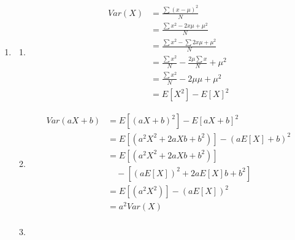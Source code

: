 \documentclass{article}
\begin{document}
\begin{enumerate}
\begin{enumerate}
        Prior: $P(\mu) = \frac{1}{\sqrt{2\pi \tau^2}} \exp\left(-\frac{(\mu - \mu_0)^2}{2\tau^2}\right)$ where $\mu_0 = 0$ and $\tau^2 = 1$.


        $$\log P(\mu | x_1) \propto -\frac{(5 - \mu)^2}{2(4)} - \frac{\mu^2}{2(1)}$$

        $$\frac{d}{d\mu} \left[ -\frac{(5 - \mu)^2}{8} - \frac{\mu^2}{2} \right] = \frac{5 - \mu}{4} - \mu = 0$$
        this gives \(\hat \mu = 1\)
        \item we instead get $$\log P(\mu | X) \propto -\sum_{i=1}^n \frac{(x_i - \mu)^2}{2\sigma^2} - \frac{(\mu - \mu_0)^2}{2\tau^2}$$
        $$\frac{d}{dx} \log P(\mu | X) = \frac{1}{\sigma^2} \sum_{i=1}^n (x_i - \mu) - \frac{\mu - \mu_0}{\tau^2} = 0$$
        we get \(\hat \mu = \frac{n}{n+4}\bar x\) where \(\bar x\) represents the mean of the samples. 

        \item the first term in the \(\hat \mu\) in part \(b\) goes to 1 which means it converges to the mean of \(x\) as \(n\to \infty\).
        \end{enumerate}
        
        \item \begin{enumerate}
        \item \begin{equation}
            \begin{split}
                Var(X)&=\frac{\sum ( x-\mu)^2}{N}\\
                &=\frac{\sum x^2 - 2x\mu + \mu^2}{N}\\
                &=\frac{\sum x^2 - \sum 2x\mu + \mu^2}{N}\\
                &=\frac{\sum x^2}{N} - \frac{2\mu \sum x}{N} + \mu^2\\
                &=\frac{\sum x^2}{N} - {2\mu \mu }{} + \mu^2\\
                &=E[X^2]-E[X]^2
            \end{split}
        \end{equation}
        \item 

        \begin{equation}
            \begin{split}
                Var(aX+b) &= E[(aX+b)^2] - E[aX+b]^2\\
                &= E[(a^2X^2 + 2aXb+b^2)] - (aE[X]+b)^2\\
                &= E[(a^2X^2 + 2aXb+b^2)] \\
                &\quad - [(aE[X])^2 + 2aE[X]b +b^2]\\
                &= E[(a^2X^2 )] - (aE[X])^2 \\
                &= a^2 Var(X)\\
            \end{split}
        \end{equation}
        \item 


\end{enumerate}
\end{enumerate}
\end{document}
